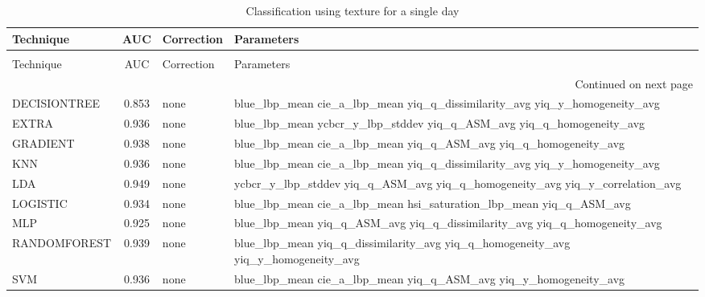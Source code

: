 \begin{longtable}{lcll}
\caption[Classification using texture for a single day]{Classification using texture for a single day}
\label{table:results-texture-single-day}\\
\toprule
   Technique &   AUC & Correction &                                                                        Parameters \\
\midrule
\endfirsthead
\caption[]{Classification using texture for a single day} \\
\toprule
   Technique &   AUC & Correction &                                                                        Parameters \\
\midrule
\endhead
\midrule
\multicolumn{4}{r}{{Continued on next page}} \\
\midrule
\endfoot

\bottomrule
\endlastfoot
DECISIONTREE & 0.853 &       none &        blue\_lbp\_mean cie\_a\_lbp\_mean yiq\_q\_dissimilarity\_avg yiq\_y\_homogeneity\_avg \\
       EXTRA & 0.936 &       none &              blue\_lbp\_mean ycbcr\_y\_lbp\_stddev yiq\_q\_ASM\_avg yiq\_q\_homogeneity\_avg \\
    GRADIENT & 0.938 &       none &                  blue\_lbp\_mean cie\_a\_lbp\_mean yiq\_q\_ASM\_avg yiq\_q\_homogeneity\_avg \\
         KNN & 0.936 &       none &        blue\_lbp\_mean cie\_a\_lbp\_mean yiq\_q\_dissimilarity\_avg yiq\_y\_homogeneity\_avg \\
         LDA & 0.949 &       none &      ycbcr\_y\_lbp\_stddev yiq\_q\_ASM\_avg yiq\_q\_homogeneity\_avg yiq\_y\_correlation\_avg \\
    LOGISTIC & 0.934 &       none &                blue\_lbp\_mean cie\_a\_lbp\_mean hsi\_saturation\_lbp\_mean yiq\_q\_ASM\_avg \\
         MLP & 0.925 &       none &         blue\_lbp\_mean yiq\_q\_ASM\_avg yiq\_q\_dissimilarity\_avg yiq\_q\_homogeneity\_avg \\
RANDOMFOREST & 0.939 &       none & blue\_lbp\_mean yiq\_q\_dissimilarity\_avg yiq\_q\_homogeneity\_avg yiq\_y\_homogeneity\_avg \\
         SVM & 0.936 &       none &                  blue\_lbp\_mean cie\_a\_lbp\_mean yiq\_q\_ASM\_avg yiq\_y\_homogeneity\_avg \\
\end{longtable}

